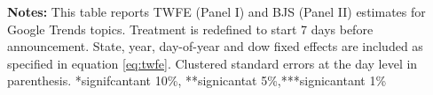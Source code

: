 \documentclass{article}
\begin{document}
\begin{table}[htb!]
\caption{DiD estimates on Topics (1-week anticipation)}
\begin{center}
\end{center}
\label{tab:twfe_bjs2}
\justifying
{\scriptsize \textbf{Notes:} This table reports TWFE (Panel I) and BJS (Panel II) estimates for Google Trends topics. Treatment is redefined to start 7 days before announcement. State, year, day-of-year and dow fixed effects are included as specified in equation \ref{eq:twfe}. Clustered standard errors at the day level in parenthesis.  *signifcantant 10\%, **signicantat 5\%,***signicantant 1\%  \par} 
\end{table}
\end{document}
